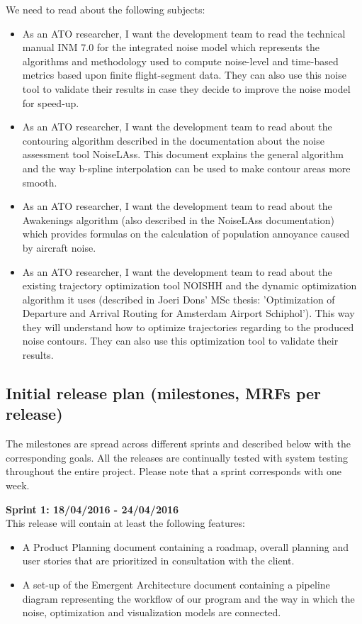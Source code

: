 ﻿\documentclass[a4paper,english,fleqn]{exam}
\begin{document}
We need to read about the following subjects:
\begin{itemize}
\item As an ATO researcher, I want the development team to read the technical manual INM 7.0 for the integrated noise model which represents the algorithms and methodology used to compute noise-level and time-based metrics based upon finite flight-segment data. They can also use this noise tool to validate their results in case they decide to improve the noise model for speed-up.
\item As an ATO researcher, I want the development team to read about the contouring algorithm described in the documentation about the noise assessment tool NoiseLAss. This document explains the general algorithm and the way b-spline interpolation can be used to make contour areas more smooth.
\item As an ATO researcher, I want the development team to read about the Awakenings algorithm (also described in the NoiseLAss documentation) which provides formulas on the calculation of population annoyance caused by aircraft noise.
\item As an ATO researcher, I want the development team to read about the existing trajectory optimization tool NOISHH and the dynamic optimization algorithm it uses (described in Joeri Dons' MSc thesis: 'Optimization of Departure and Arrival Routing for Amsterdam Airport Schiphol'). This way they will understand how to optimize trajectories regarding to the produced noise contours. They can also use this optimization tool to validate their results. 
\end{itemize}

\newpage 

\subsection{Initial release plan (milestones, MRFs per release)}
The milestones are spread across different sprints and described below with the corresponding goals. All the releases are continually tested with system testing throughout the entire project. Please note that a sprint corresponds with one week.

\textbf{Sprint 1: 18/04/2016 - 24/04/2016 } \\
This release will contain at least the following features:
\begin{itemize}
\item A Product Planning document containing a roadmap, overall planning and user stories that are prioritized in consultation with the client.
\item A set-up of the Emergent Architecture document containing a pipeline diagram representing the workflow of our program and the way in which the noise, optimization and visualization models are connected.

\end{itemize}
\end{document}
